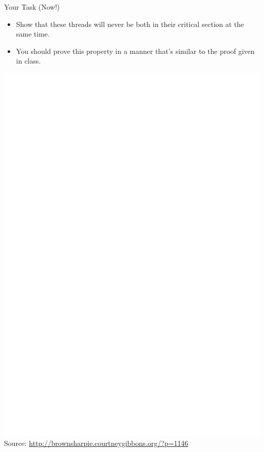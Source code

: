 \begin{frame}[fragile]{Your Task (Now!)}
  \begin{itemize}
  \item Show that these threads will never be both in their critical
    section at the same time.
  \item You should prove this property in a manner that’s similar to
    the proof given in class.
  \end{itemize}

  
  \begin{center}
    \includegraphics[scale=1.5]{figures/induction} \\
    \tiny{Source: \url{http://brownsharpie.courtneygibbons.org/?p=1146}}
  \end{center}
\end{frame}

